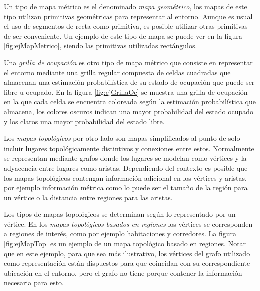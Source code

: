 Un tipo de mapa métrico es el denominado \emph{mapa geométrico}, los mapas de este tipo utilizan primitivas geométricas para representar al entorno. Aunque es usual el uso de segmentos de recta como primitiva, es posible utilizar otras primitivas de ser conveniente. Un ejemplo de este tipo de mapa se puede ver en la figura \ref{fig:ejMapMetrico}, siendo las primitivas utilizadas rectángulos.

Una \emph{grilla de ocupación} es otro tipo de mapa métrico que consiste en representar el entorno mediante una grilla regular compuesta de celdas cuadradas que almacenan una estimación probabilística de su estado de ocupación que puede ser libre u ocupado. En la figura \ref{fig:ejGrillaOc} se muestra una grilla de ocupación en la que cada celda se encuentra coloreada según la estimación probabilística que almacena, los colores oscuros indican una mayor probabilidad del estado ocupado y los claros una mayor probabilidad del estado libre.

Los \emph{mapas topológicos} por otro lado son mapas simplificados al punto de solo incluir lugares topológicamente distintivos y conexiones entre estos. Normalmente se representan mediante grafos donde los lugares se modelan como vértices y la adyacencia entre lugares como aristas. Dependiendo del contexto es posible que los mapas topológicos contengan información adicional en los vértices y aristas, por ejemplo información métrica como lo puede ser el tamaño de la región para un vértice o la distancia entre regiones para las aristas.

Los tipos de mapas topológicos se determinan según lo representado por un vértice. En los \emph{mapas topológicos basados en regiones} los vértices se corresponden a regiones de interés, como por ejemplo habitaciones y corredores. La figura \ref{fig:ejMapTop} es un ejemplo de un mapa topológico basado en regiones. Notar que en este ejemplo, para que sea más ilustrativo, los vértices del grafo utilizado como representación están dispuestos para que coincidan con su correspondiente ubicación en el entorno, pero el grafo no tiene porque contener la información necesaria para esto.

